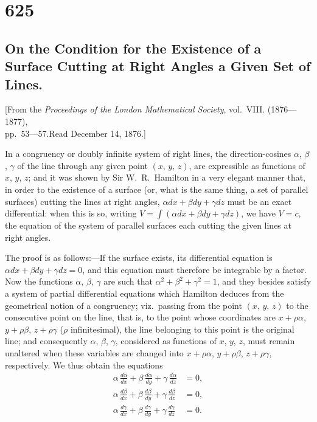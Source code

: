\documentclass[12pt,a4paper]{article}
\begin{document}
\newpage


\section*{625}
\subsection*{On the Condition for the Existence of a Surface Cutting at Right Angles a Given Set of Lines.}

\begin{center}
\small
[From the \textit{Proceedings of the London Mathematical Society}, vol.~VIII. (1876---1877),\\
pp.~53---57.\quad Read December 14, 1876.]
\end{center}

\medskip
\noindent
In a congruency or doubly infinite system of right lines, the direction-cosines $\alpha$, $\beta$, $\gamma$ of the line through any given point $(x,\,y,\,z)$, are expressible as functions of $x$, $y$, $z$; and it was shown by Sir W.~R.~Hamilton in a very elegant manner that, in order to the existence of a surface (or, what is the same thing, a set of parallel surfaces) cutting the lines at right angles, $\alpha dx + \beta dy + \gamma dz$ must be an exact differential: when this is so, writing $V = \int(\alpha dx + \beta dy + \gamma dz)$, we have $V = c$, the equation of the system of parallel surfaces each cutting the given lines at right angles.

The proof is as follows:---If the surface exists, its differential equation is $\alpha dx + \beta dy + \gamma dz = 0$, and this equation must therefore be integrable by a factor. Now the functions $\alpha$, $\beta$, $\gamma$ are such that $\alpha^2 + \beta^2 + \gamma^2 = 1$, and they besides satisfy a system of partial differential equations which Hamilton deduces from the geometrical notion of a congruency; viz.\ passing from the point $(x,\,y,\,z)$ to the consecutive point on the line, that is, to the point whose coordinates are $x + \rho\alpha$, $y + \rho\beta$, $z + \rho\gamma$ ($\rho$ infinitesimal), the line belonging to this point is the original line; and consequently $\alpha$, $\beta$, $\gamma$, considered as functions of $x$, $y$, $z$, must remain unaltered when these variables are changed into $x + \rho\alpha$, $y + \rho\beta$, $z + \rho\gamma$, respectively. We thus obtain the equations
\begin{align*}
\alpha\,\frac{d\alpha}{dx} + \beta\,\frac{d\alpha}{dy} + \gamma\,\frac{d\alpha}{dz} &= 0, \\
\alpha\,\frac{d\beta}{dx} + \beta\,\frac{d\beta}{dy} + \gamma\,\frac{d\beta}{dz} &= 0, \\
\alpha\,\frac{d\gamma}{dx} + \beta\,\frac{d\gamma}{dy} + \gamma\,\frac{d\gamma}{dz} &= 0.
\end{align*}
\end{document}
